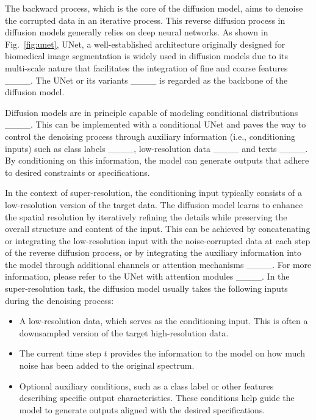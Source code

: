 The backward process, which is the core of the diffusion model, aims to denoise the corrupted data in an iterative process. 
This reverse diffusion process in diffusion models generally relies on deep neural networks. As shown in Fig.~\ref{fig:unet}, UNet, a well-established architecture originally designed for biomedical image segmentation is widely used in diffusion models due to its multi-scale nature that facilitates the integration of fine and coarse features ____. 
The UNet or its variants ____ is regarded as the backbone of the diffusion model.


Diffusion models are in principle capable of modeling
conditional distributions ____.
This can be implemented with a conditional UNet and paves the way to control the denoising process through auxiliary information (i.e., conditioning inputs) such as class labels ____, low-resolution data ____ and texts ____.
By conditioning on this information, the model can generate outputs that adhere to desired constraints or specifications.

In the context of super-resolution, the conditioning input typically consists of a low-resolution version of the target data. The diffusion model learns to enhance the spatial resolution by iteratively refining the details while preserving the overall structure and content of the input. This can be achieved by concatenating or integrating the low-resolution input with the noise-corrupted data at each step of the reverse diffusion process, or by integrating the auxiliary information into the model through additional channels or attention mechanisms ____. For more information, please refer to the UNet with attention modules ____.
In the super-resolution task, the diffusion model usually takes the following inputs during the denoising process:
\begin{itemize}
    \item A low-resolution data, which serves as the conditioning input. This is often a downsampled version of the target high-resolution data.
    \item The current time step \( t \) provides the information to the model on how much noise has been added to the original spectrum.
    \item Optional auxiliary conditions, such as a class label or other features describing specific output characteristics. These conditions help guide the model to generate outputs aligned with the desired specifications.
\end{itemize}

